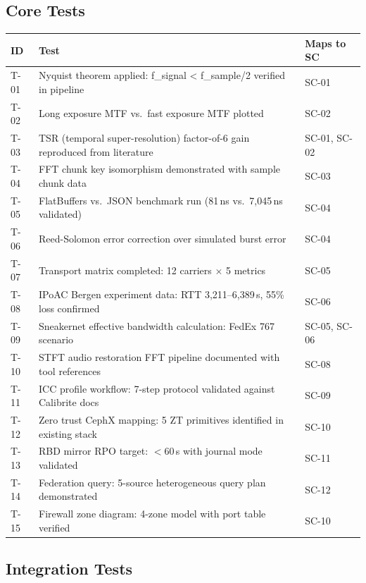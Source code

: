 \documentclass[11pt,letterpaper]{article}
\newcommand{\thead}[1]{\cellcolor{TableHead}\textbf{\sffamily\color{white}\small #1}}
\newcommand{\altrow}{\rowcolor{TableAlt}}
\begin{document}
\subsection{Core Tests}

\begin{longtable}{p{2cm}p{6cm}p{4cm}}
\toprule
\thead{ID} & \thead{Test} & \thead{Maps to SC} \\
\midrule
\endhead
T-01 & Nyquist theorem applied: f\_signal < f\_sample/2 verified in pipeline & SC-01 \\
\altrow T-02 & Long exposure MTF vs.\ fast exposure MTF plotted & SC-02 \\
T-03 & TSR (temporal super-resolution) factor-of-6 gain reproduced from literature & SC-01, SC-02 \\
\altrow T-04 & FFT chunk key isomorphism demonstrated with sample chunk data & SC-03 \\
T-05 & FlatBuffers vs.\ JSON benchmark run (81\,ns vs.\ 7,045\,ns validated) & SC-04 \\
\altrow T-06 & Reed-Solomon error correction over simulated burst error & SC-04 \\
T-07 & Transport matrix completed: 12 carriers $\times$ 5 metrics & SC-05 \\
\altrow T-08 & IPoAC Bergen experiment data: RTT 3,211--6,389\,s, 55\% loss confirmed & SC-06 \\
T-09 & Sneakernet effective bandwidth calculation: FedEx 767 scenario & SC-05, SC-06 \\
\altrow T-10 & STFT audio restoration FFT pipeline documented with tool references & SC-08 \\
T-11 & ICC profile workflow: 7-step protocol validated against Calibrite docs & SC-09 \\
\altrow T-12 & Zero trust CephX mapping: 5 ZT primitives identified in existing stack & SC-10 \\
T-13 & RBD mirror RPO target: $<$60\,s with journal mode validated & SC-11 \\
\altrow T-14 & Federation query: 5-source heterogeneous query plan demonstrated & SC-12 \\
T-15 & Firewall zone diagram: 4-zone model with port table verified & SC-10 \\
\bottomrule
\end{longtable}

\subsection{Integration Tests}
\end{document}

